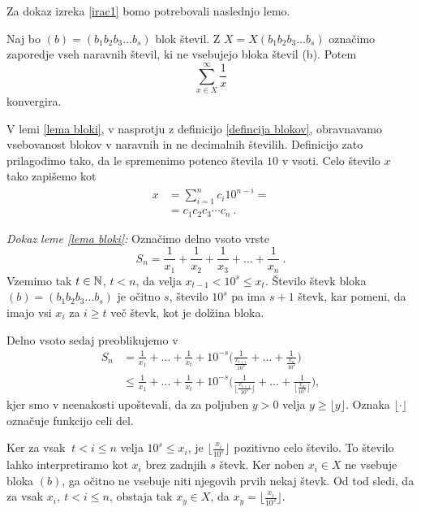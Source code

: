 \documentclass[twoside,11pt]{article}
\begin{document}
Za dokaz izreka \ref{irac1} bomo potrebovali naslednjo lemo.

\begin{lema}\label{lema bloki}
    Naj bo $(b) = (b_1b_2b_3 \dots b_s)$ blok števil. Z $X = X(b_1b_2b_3 \dots b_s)$ označimo
    zaporedje vseh naravnih števil, ki ne vsebujejo bloka števil (b). Potem 
    \[ \sum_{x \in X}^{\infty} \frac{1}{x}\] konvergira.
\end{lema}

\begin{opomba}
    V lemi \ref{lema bloki}, v nasprotju z definicijo \ref{defincija blokov}, obravnavamo vsebovanost blokov v naravnih
    in ne decimalnih številih. Definicijo zato prilagodimo tako, da le spremenimo potenco števila
    $10$ v vsoti. Celo število $x$ tako zapišemo kot 
    \[ 
        \begin{split}
            x & = \sum^n_{i=1} c_i 10^{n-i} = \\
            & = c_1c_2c_3 \cdots c_n \ .
        \end{split} \]
\end{opomba}

\noindent
{\em Dokaz leme \ref{lema bloki}:\/} 
Označimo delno vsoto vrste 
\[ S_n = \frac{1}{x_1} + \frac{1}{x_2} + \frac{1}{x_3} + \dots + \frac{1}{x_n} \ . \]
Vzemimo tak $t \in \mathbb{N} $, $t < n$, da velja $x_{t-1} < 10^s \leq x_t$. Število števk bloka $(b) = (b_1b_2b_3 \dots b_s)$
je očitno $s$, število $10^s$ pa ima $s+1$ števk, kar pomeni, da imajo vsi $x_i$ za $i \geq t$
več števk, kot je dolžina bloka. 

Delno vsoto sedaj preoblikujemo v
\[ 
    \begin{split}
        S_n &= \frac{1}{x_1} + \dots + \frac{1}{x_t} + 10^{-s}\bigg(\frac{1}{\frac{x_{t + 1}}{10^s}} + \dots + \frac{1}{\frac{x_n}{10^s}}\bigg) \\
        &\leq \frac{1}{x_1} + \dots + \frac{1}{x_t} + 10^{-s}\bigg(\frac{1}{ \lfloor\frac{x_{t + 1}}{10^s}\rfloor} + \dots + \frac{1}{\lfloor\frac{x_n}{10^s}\rfloor}\bigg) ,
    \end{split}
     \]
kjer smo v neenakosti upoštevali, da za poljuben $y > 0$ velja $y \geq \lfloor y \rfloor$.
Oznaka $\lfloor \cdot \rfloor$ označuje funkcijo celi del.

Ker za vsak $\ t < i \leq n$ velja $10^s \leq x_i$, je $\lfloor \frac{x_i}{10^s} \rfloor$ pozitivno celo število.
To število lahko interpretiramo kot $x_i$ brez zadnjih $s$ števk. 
Ker noben $x_i \in X$ ne vsebuje bloka $(b)$, 
ga očitno ne vsebuje niti njegovih prvih nekaj števk. 
Od tod sledi, da za vsak $x_i, \ t < i \leq n$, obstaja tak $x_y \in X$, da $ x_y = \lfloor \frac{x_i}{10^s} \rfloor$.
\end{document}
